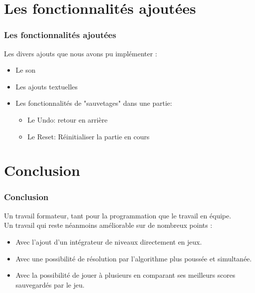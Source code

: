 \documentclass[13pt]{beamer}
\begin{document}
\section{Les fonctionnalités ajoutées}
\begin{frame}
    \frametitle{Les fonctionnalités ajoutées}
    Les divers ajouts que nous avons pu implémenter :
    \begin{itemize}
        \item Le son
        \item Les ajouts textuelles
        \item Les fonctionnalités de "sauvetages" dans une partie:
        \begin{itemize}
            \item Le Undo: retour en arrière
            \item Le Reset: Réinitialiser la partie en cours
        \end{itemize}
    \end{itemize}
\end{frame}

\section{Conclusion}
\begin{frame}
    \frametitle{Conclusion}
    Un travail formateur, tant pour la programmation que le travail en équipe.
    \\
    \bigskip
    Un travail qui reste néanmoins améliorable sur de nombreux points :
    \begin{itemize}
        \item Avec l'ajout d'un intégrateur de niveaux directement en jeux.
        \item Avec une possibilité de résolution par l'algorithme plus poussée et simultanée.
        \item Avec la possibilité de jouer à plusieurs en comparant ses meilleurs scores sauvegardés par le jeu.
    \end{itemize}
\end{frame}
\end{document}
